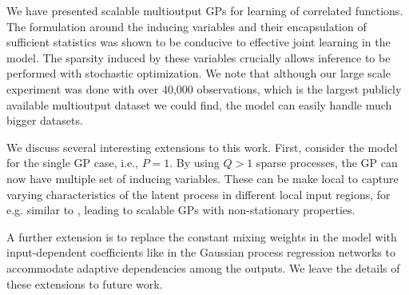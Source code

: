 We have presented scalable multioutput GPs for learning of correlated functions.
The formulation around the inducing variables and their encapsulation of sufficient statistics was shown to be conducive to effective joint learning in the model. 
The sparsity induced by these variables crucially allows inference to be performed with stochastic optimization.
We note that although our large scale experiment was done with over 40,000 observations, which is the largest publicly available multioutput dataset we could find, the model can easily handle much bigger datasets.

We discuss several interesting extensions to this work.
First, consider the model for the single GP case, i.e., $P = 1$. By using $Q > 1$ sparse processes, the GP can now have multiple set of inducing variables.
These can be make local to capture varying characteristics of the latent process in different local input regions, for e.g. similar to \citep{nguyen2014fast}, leading to scalable GPs with non-stationary properties. 

A further extension is to replace the constant mixing weights in the model with input-dependent coefficients like in the Gaussian process regression networks \citep[GPRN][]{wilson-et-al-icml-12} to accommodate adaptive dependencies among the outputs.
We leave the details of these extensions to future work.